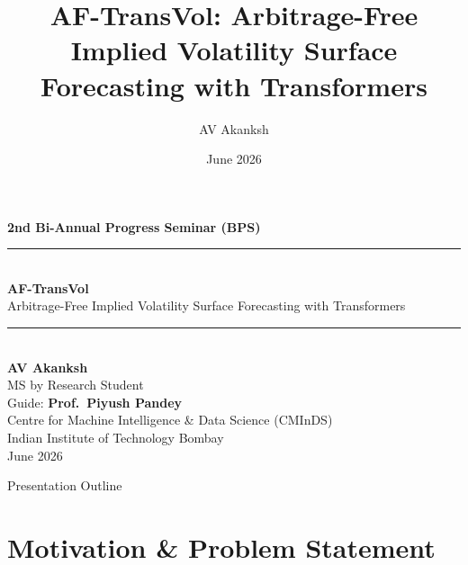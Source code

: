 \documentclass[aspectratio=169,10pt]{beamer}
\title[AF-TransVol | 2nd BPS]{AF-TransVol: Arbitrage-Free Implied Volatility Surface Forecasting with Transformers}
\author[AV Akanksh]{AV Akanksh}
\institute[IIT Bombay]{CMInDS, IIT Bombay}
\date{June 2026}
\begin{document}
\begin{frame}[plain]

  \vspace{0.055\paperheight}
  \begin{center}
    {\color{white}\small\textbf{2nd Bi-Annual Progress Seminar (BPS)}}\\[4pt]
    {\color{iitbgold}\rule{0.55\linewidth}{0.7pt}}\\[6pt]
    {\color{white}\large\textbf{AF-TransVol}}\\[3pt]
    {\color{white}\small Arbitrage-Free Implied Volatility Surface Forecasting with Transformers}\\[12pt]
    {\color{iitbsaff}\rule{0.45\linewidth}{0.5pt}}\\[10pt]
    {\color{iitbnavy}\normalsize\textbf{AV Akanksh}}\\[2pt]
    {\color{iitbnavy}\small MS by Research Student}\\[1pt]
    {\color{iitbnavy}\small Guide: \textbf{Prof.~Piyush Pandey}}\\[6pt]
    {\color{iitbnavy!80}\footnotesize Centre for Machine Intelligence \& Data Science (CMInDS)}\\[1pt]
    {\color{iitbnavy!80}\footnotesize Indian Institute of Technology Bombay}\\[3pt]
    {\color{iitbnavy!60}\scriptsize June 2026}
  \end{center}
\end{frame}

\begin{frame}{Presentation Outline}
  \tableofcontents[hideallsubsections]
\end{frame}

\section{Motivation \& Problem Statement}
\end{document}
